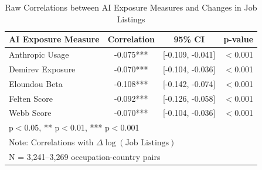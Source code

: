\documentclass[11pt]{article}
\begin{document}
\begin{table}[H]
\centering
\caption{Raw Correlations between AI Exposure Measures and Changes in Job Listings}
\begin{tabular}{lccc}
\hline\hline
AI Exposure Measure & Correlation & 95\% CI & p-value \\
\midrule
Anthropic Usage & -0.075*** & [-0.109, -0.041] & $<$0.001 \\
Demirev Exposure & -0.070*** & [-0.104, -0.036] & $<$0.001 \\
Eloundou Beta & -0.108*** & [-0.142, -0.074] & $<$0.001 \\
Felten Score & -0.092*** & [-0.126, -0.058] & $<$0.001 \\
Webb Score & -0.070*** & [-0.104, -0.036] & $<$0.001 \\
\hline\hline
\multicolumn{4}{l}{\footnotesize * p$<$0.05, ** p$<$0.01, *** p$<$0.001} \\
\multicolumn{4}{l}{\footnotesize Note: Correlations with $\Delta \log(\text{Job Listings})$} \\
\multicolumn{4}{l}{\footnotesize N = 3,241--3,269 occupation-country pairs} \\
\end{tabular}
\label{table:raw_correlations}
\end{table}
\end{document}
